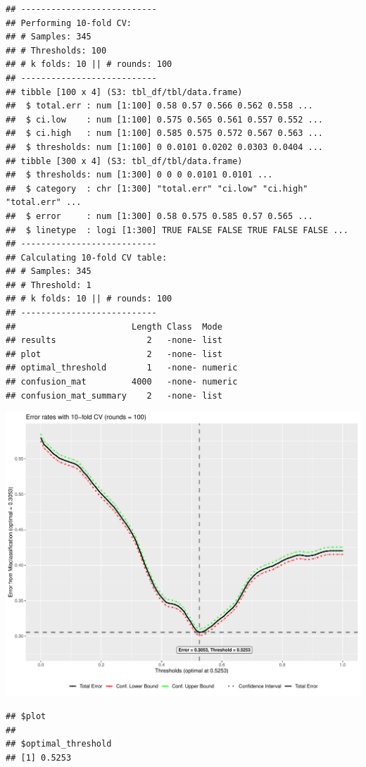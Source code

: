 \documentclass[
  11pt,
  a4paper,
]{scrartcl}
\begin{document}
\begin{verbatim}
## ---------------------------
## Performing 10-fold CV:
## # Samples: 345
## # Thresholds: 100
## # k folds: 10 || # rounds: 100
## ---------------------------
## tibble [100 x 4] (S3: tbl_df/tbl/data.frame)
##  $ total.err : num [1:100] 0.58 0.57 0.566 0.562 0.558 ...
##  $ ci.low    : num [1:100] 0.575 0.565 0.561 0.557 0.552 ...
##  $ ci.high   : num [1:100] 0.585 0.575 0.572 0.567 0.563 ...
##  $ thresholds: num [1:100] 0 0.0101 0.0202 0.0303 0.0404 ...
## tibble [300 x 4] (S3: tbl_df/tbl/data.frame)
##  $ thresholds: num [1:300] 0 0 0 0.0101 0.0101 ...
##  $ category  : chr [1:300] "total.err" "ci.low" "ci.high" "total.err" ...
##  $ error     : num [1:300] 0.58 0.575 0.585 0.57 0.565 ...
##  $ linetype  : logi [1:300] TRUE FALSE FALSE TRUE FALSE FALSE ...
## ---------------------------
## Calculating 10-fold CV table:
## # Samples: 345
## # Threshold: 1
## # k folds: 10 || # rounds: 100
## ---------------------------
##                       Length Class  Mode   
## results                  2   -none- list   
## plot                     2   -none- list   
## optimal_threshold        1   -none- numeric
## confusion_mat         4000   -none- numeric
## confusion_mat_summary    2   -none- list
\end{verbatim}

\begin{center}\includegraphics{figure/analysis-glm-10cv-plot-1} \end{center}

\begin{verbatim}
## $plot
## 
## $optimal_threshold
## [1] 0.5253
\end{verbatim}
\end{document}
